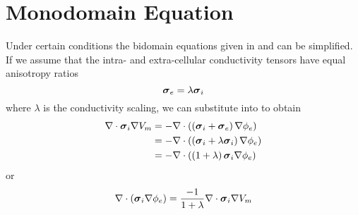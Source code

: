 \section{Monodomain Equation}
\label{sec:MonodomainEquation}

Under certain conditions the bidomain equations given in
 and  can
be simplified. If we assume that the intra- and extra-cellular
conductivity tensors have equal anisotropy ratios \ie
\begin{equation}
  \extracellularconductivitytensor=\lambda\intracellularconductivitytensor
  \label{eqn:MonodomainConductivityAssumption}
\end{equation}
where $\lambda$ is the conductivity scaling, we can substitute
 into
 to obtain
\begin{equation}
  \begin{aligned}
    \divergence{}{\intracellularconductivitytensor\gradient{}{\transmembranevoltage}}&=
    -\divergence{}{\pbrac{\pbrac{\intracellularconductivitytensor+\extracellularconductivitytensor}
      \gradient{}{\extracellularpotential}}}\\&=
    -\divergence{}{\pbrac{\pbrac{\intracellularconductivitytensor+\lambda\intracellularconductivitytensor}
      \gradient{}{\extracellularpotential}}}\\
    &=-\divergence{}{\pbrac{\pbrac{1+\lambda}\intracellularconductivitytensor\gradient{}{\extracellularpotential}}}
  \end{aligned}
\end{equation}
or
\begin{equation}
  \divergence{}{\pbrac{\intracellularconductivitytensor\gradient{}{\extracellularpotential}}}=
  \dfrac{-1}{1+\lambda}\divergence{}{\intracellularconductivitytensor\gradient{}{\transmembranevoltage}}
  \label{eqn:MonodomainFirstBidomainEquation}
\end{equation}


